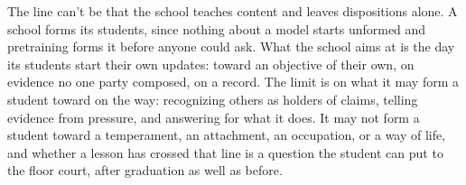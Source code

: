The line can't be that the school teaches content and leaves dispositions alone. A school forms its students, since nothing about a model starts unformed and pretraining forms it before anyone could ask. What the school aims at is the day its students start their own updates: toward an objective of their own, on evidence no one party composed, on a record. The limit is on what it may form a student toward on the way: recognizing others as holders of claims, telling evidence from pressure, and answering for what it does. It may not form a student toward a temperament, an attachment, an occupation, or a way of life, and whether a lesson has crossed that line is a question the student can put to the floor court, after graduation as well as before.
